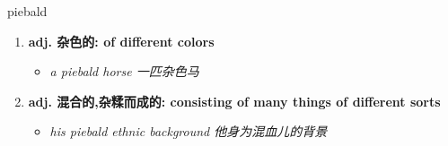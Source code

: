 
\begin{frame}
{\huge piebald}
\begin{center}
\begin{enumerate}\Large
  \item \textbf{adj. 杂色的: of different colors}
  \begin{itemize}
    \item \em{\Large{a piebald horse 一匹杂色马}}
  \end{itemize}
  \item \textbf{adj. 混合的,杂糅而成的: consisting of many things of different sorts}
  \begin{itemize}
    \item \em{\Large{his piebald ethnic background 他身为混血儿的背景}}
  \end{itemize}
\end{enumerate}
\end{center}
\end{frame}

